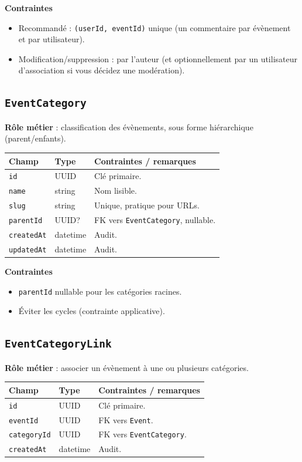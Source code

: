 \documentclass[11pt,a4paper]{article}
\begin{document}
\textbf{Contraintes}
\begin{itemize}
  \item Recommandé : \texttt{(userId, eventId)} unique (un commentaire par évènement et par utilisateur).
  \item Modification/suppression : par l’auteur (et optionnellement par un utilisateur d’association si vous décidez une modération).
\end{itemize}

\subsection{\texttt{EventCategory}}
\textbf{Rôle métier} : classification des évènements, sous forme hiérarchique (parent/enfants).

\begin{longtable}{@{}p{}p{}p{}@{}}
\toprule
\textbf{Champ} & \textbf{Type} & \textbf{Contraintes / remarques}\\
\midrule
\endhead
\texttt{id} & UUID & Clé primaire.\\
\texttt{name} & string & Nom lisible.\\
\texttt{slug} & string & Unique, pratique pour URLs.\\
\texttt{parentId} & UUID? & FK vers \texttt{EventCategory}, nullable.\\
\texttt{createdAt} & datetime & Audit.\\
\texttt{updatedAt} & datetime & Audit.\\
\bottomrule
\end{longtable}

\textbf{Contraintes}
\begin{itemize}
  \item \texttt{parentId} nullable pour les catégories racines.
  \item Éviter les cycles (contrainte applicative).
\end{itemize}

\subsection{\texttt{EventCategoryLink}}
\textbf{Rôle métier} : associer un évènement à une ou plusieurs catégories.

\begin{longtable}{@{}p{}p{}p{}@{}}
\toprule
\textbf{Champ} & \textbf{Type} & \textbf{Contraintes / remarques}\\
\midrule
\endhead
\texttt{id} & UUID & Clé primaire.\\
\texttt{eventId} & UUID & FK vers \texttt{Event}.\\
\texttt{categoryId} & UUID & FK vers \texttt{EventCategory}.\\
\texttt{createdAt} & datetime & Audit.\\
\bottomrule
\end{longtable}
\end{document}

